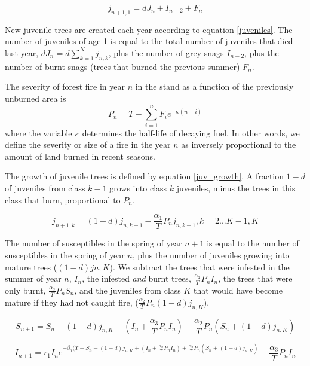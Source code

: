 \begin{equation}
j_{n+1, 1} = d J_n + I_{n-2} + F_n
\label{juveniles}
\end{equation}


New juvenile trees are created each year according to equation \ref{juveniles}. The number of juveniles of age 1 is equal to the total number of juveniles that died last year, $d J_n =  d \sum_{k = 1}^{N} j_{n,k}$, plus the number of grey snags $I_{n-2}$, plus the number of burnt snags (trees that burned the previous summer) $F_n$. 

The severity of forest fire in year $n$ in the stand as a function of the previously unburned area is
\begin{equation}
P_n = T -\sum_{i=1}^{n}  F_i e^{-\kappa (n - i)}
\end{equation}
where the variable $\kappa$ determines the half-life of decaying fuel. In other words, we define the severity or size of a fire in the year $n$ as inversely proportional to the amount of land burned in recent seasons.


The growth of juvenile trees is defined by equation \ref{juv_growth}. A fraction $1-d$ of juveniles from class $k-1$ grows into class $k$ juveniles, minus the trees in this class that burn, proportional to $P_n$. 

\begin{equation}
  j_{n+1, k} = (1-d) j_{n, k - 1} - \frac{\alpha_1}{T}P_n j_{n,k-1}, k = 2 ... K-1 ,K
  \label{juv_growth}
  \end{equation}
  


 The number of susceptibles in the spring of year $n+1$ is equal to the number of susceptibles in the spring of year $n$, plus the number of juveniles growing into mature trees ($(1 - d) j {n, K} $). We subtract the trees that were infested in the summer of year $n$, $I_n$, the infested \textit{and} burnt trees, $\frac{\alpha_3}{T} P_n I_n$, the trees that were only burnt, $\frac{\alpha_2}{T} P_n S_n$, and the juveniles from class $K$ that would have become mature if they had not caught fire, ($\frac{\alpha_2}{T} P_n (1-d) j_{n, K}$).

\begin{equation}
S_{n+1} = S_n + (1 - d) j_{n, K} - (I_n + \frac{\alpha_3}{T} P_n I_n) - \frac{\alpha_2}{T} P_n \left( S_n + (1-d) j_{n, K}\right)
\end{equation}


\begin{equation}
I_{n+1} = r_1 I_n e^{-\beta_1 (T - S_n - (1 - d) j_{n, K} + (I_n + \frac{\alpha_2}{T} P_n I_n) +  \frac{\alpha_2}{T} P_n \left( S_n + (1-d) j_{n, K}\right) } - \frac{\alpha_3}{T} P_n I_n
\end{equation}

